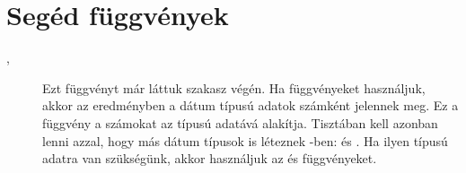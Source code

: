 \section{Segéd függvények}\label{sec:4.3}

\begin{description}
\item[, ] Ezt függvényt már láttuk
  szakasz
  végén. Ha  függvényeket használjuk, akkor az eredményben a
  dátum típusú adatok számként jelennek meg.  Ez a függvény a számokat
  az   típusú adatává alakítja. Tisztában kell azonban lenni
  azzal, hogy más dátum típusok is léteznek -ben:  és
  . Ha ilyen típusú adatra van szükségünk, akkor használjuk az
   és  függvényeket.  


\end{description}
